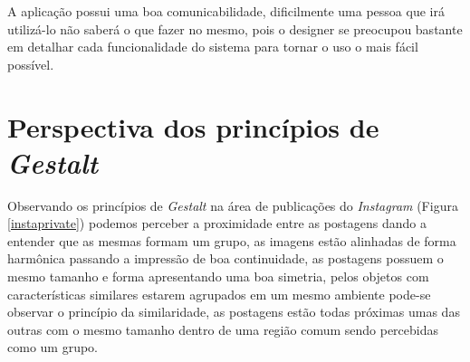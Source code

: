 \documentclass[
	12pt,				%
	openright,			%
	oneside,			%
	a4paper,			%
	english,			%
	french,				%
	spanish,			%
	brazil,				%
	]{abntex2}
\begin{document}
A aplicação possui uma boa comunicabilidade, dificilmente uma pessoa que irá utilizá-lo não saberá o que fazer no mesmo, pois o designer se preocupou bastante em detalhar cada funcionalidade do sistema para tornar o uso o mais fácil possível.

\chapter{Perspectiva dos princípios de \textit{Gestalt}}

Observando os princípios de \textit{Gestalt} na área de publicações do \textit{Instagram} (Figura \ref{instaprivate}) podemos perceber a proximidade entre as postagens dando a entender que as mesmas formam um grupo, as imagens estão alinhadas de forma harmônica passando a impressão de boa continuidade, as postagens possuem o mesmo tamanho e forma apresentando uma boa simetria, pelos objetos com características similares estarem agrupados em um mesmo ambiente pode-se observar o princípio da similaridade, as postagens estão todas próximas umas das outras com o mesmo tamanho dentro de uma região comum sendo percebidas como um grupo.
\end{document}

